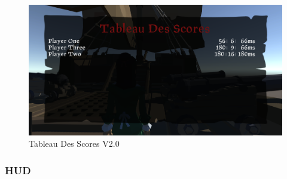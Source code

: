     \begin{figure}[hbt!]
            \centering
            \includegraphics[scale=0.3]{img/newscoreboard.PNG}
            \caption{Tableau Des Scores V2.0}
    \end{figure}
    \subsubsection{HUD}
    